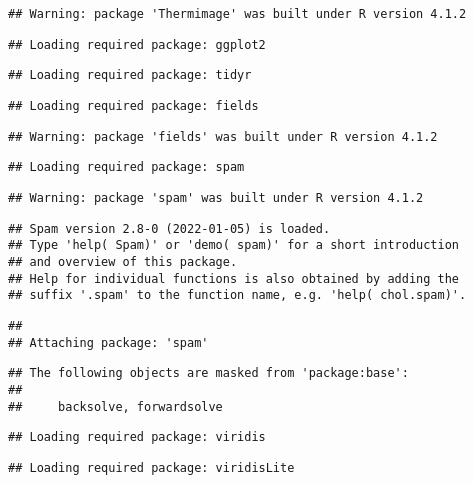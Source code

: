 \documentclass[
]{article}
\begin{document}
\begin{verbatim}
## Warning: package 'Thermimage' was built under R version 4.1.2
\end{verbatim}

\begin{verbatim}
## Loading required package: ggplot2
\end{verbatim}

\begin{verbatim}
## Loading required package: tidyr
\end{verbatim}

\begin{verbatim}
## Loading required package: fields
\end{verbatim}

\begin{verbatim}
## Warning: package 'fields' was built under R version 4.1.2
\end{verbatim}

\begin{verbatim}
## Loading required package: spam
\end{verbatim}

\begin{verbatim}
## Warning: package 'spam' was built under R version 4.1.2
\end{verbatim}

\begin{verbatim}
## Spam version 2.8-0 (2022-01-05) is loaded.
## Type 'help( Spam)' or 'demo( spam)' for a short introduction 
## and overview of this package.
## Help for individual functions is also obtained by adding the
## suffix '.spam' to the function name, e.g. 'help( chol.spam)'.
\end{verbatim}

\begin{verbatim}
## 
## Attaching package: 'spam'
\end{verbatim}

\begin{verbatim}
## The following objects are masked from 'package:base':
## 
##     backsolve, forwardsolve
\end{verbatim}

\begin{verbatim}
## Loading required package: viridis
\end{verbatim}

\begin{verbatim}
## Loading required package: viridisLite
\end{verbatim}
\end{document}
